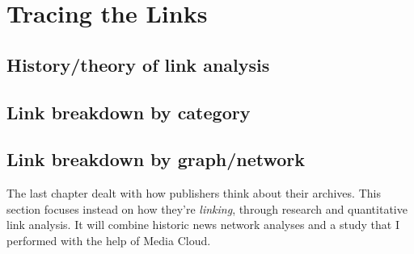 \chapter{Tracing the Links}

\section{History/theory of link analysis}

\section{Link breakdown by category}

\section{Link breakdown by graph/network}


The last chapter dealt with how publishers think about their archives. This section focuses instead on how they're \emph{linking}, through research and quantitative link analysis. It will combine historic news network analyses and a study that I performed with the help of Media Cloud.







